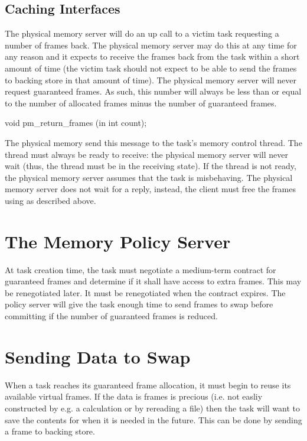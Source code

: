 \subsection{Caching Interfaces}

The physical memory server will do an up call to a victim task
requesting a number of frames back.  The physical memory server may do
this at any time for any reason and it expects to receive the frames
back from the task within a short amount of time (the victim task
should not expect to be able to send the frames to backing store in
that amount of time).  The physical memory server will never request
guaranteed frames.  As such, this number will always be less than or
equal to the number of allocated frames minus the number of guaranteed
frames.

\begin{code}
void pm\_return\_frames (in int count);
\end{code}

The physical memory send this message to the task's memory control
thread.  The thread must always be ready to receive: the physical
memory server will never wait (thus, the thread must be in the
receiving state).  If the thread is not ready, the physical memory
server assumes that the task is misbehaving.  The physical memory
server does not wait for a reply, instead, the client must free the
frames using  as described above.

\section{The Memory Policy Server}

At task creation time, the task must negotiate a medium-term contract
for guaranteed frames and determine if it shall have access to extra
frames.  This may be renegotiated later.  It must be renegotiated when
the contract expires.  The policy server will give the task enough
time to send frames to swap before committing if the number of
guaranteed frames is reduced.

\section{Sending Data to Swap}

When a task reaches its guaranteed frame allocation, it must begin to
reuse its available virtual frames.  If the data is frames is precious
(i.e. not easliy constructed by e.g. a calculation or by rereading a
file) then the task will want to save the contents for when it is
needed in the future.  This can be done by sending a frame to backing
store.

